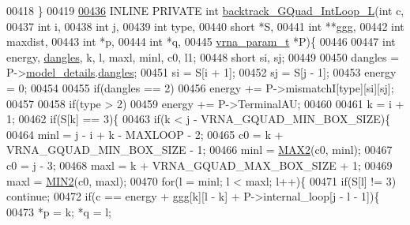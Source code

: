 \begin{DoxyCode}
00418 \}
00419 
\hypertarget{gquad_8h_source.tex_l00436}{}\hyperlink{group__gquads_ga7b371308fa5a45c7ac353ef6ed1014de}{00436} INLINE  PRIVATE \textcolor{keywordtype}{int} \hyperlink{group__gquads_ga7b371308fa5a45c7ac353ef6ed1014de}{backtrack\_GQuad\_IntLoop\_L}(\textcolor{keywordtype}{int} c,
00437                                               \textcolor{keywordtype}{int} i,
00438                                               \textcolor{keywordtype}{int} j,
00439                                               \textcolor{keywordtype}{int} type,
00440                                               \textcolor{keywordtype}{short} *S,
00441                                               \textcolor{keywordtype}{int} **ggg,
00442                                               \textcolor{keywordtype}{int} maxdist,
00443                                               \textcolor{keywordtype}{int} *p,
00444                                               \textcolor{keywordtype}{int} *q,
00445                                               \hyperlink{group__energy__parameters_structvrna__param__s}{vrna\_param\_t} *P)\{
00446 
00447   \textcolor{keywordtype}{int} energy, \hyperlink{group__model__details_ga72b511ed1201f7e23ec437e468790d74}{dangles}, k, l, maxl, minl, c0, l1;
00448   \textcolor{keywordtype}{short} si, sj;
00449 
00450   dangles = P->\hyperlink{group__energy__parameters_a7b84353eb9075c595bad4ceb871bcae7}{model\_details}.\hyperlink{structvrna__md__s_adcda4ff2ea77748ae0e8700288282efc}{dangles};
00451   si      = S[i + 1];
00452   sj      = S[j - 1];
00453   energy  = 0;
00454 
00455   \textcolor{keywordflow}{if}(dangles == 2)
00456     energy += P->mismatchI[type][si][sj];
00457 
00458   \textcolor{keywordflow}{if}(type > 2)
00459     energy += P->TerminalAU;
00460 
00461   k = i + 1;
00462   \textcolor{keywordflow}{if}(S[k] == 3)\{
00463     \textcolor{keywordflow}{if}(k < j - VRNA\_GQUAD\_MIN\_BOX\_SIZE)\{
00464       minl  = j - i + k - MAXLOOP - 2;
00465       c0    = k + VRNA\_GQUAD\_MIN\_BOX\_SIZE - 1;
00466       minl  = \hyperlink{group__utils_gadd91367918fadbc8d585940d6206d6d2}{MAX2}(c0, minl);
00467       c0    = j - 3;
00468       maxl  = k + VRNA\_GQUAD\_MAX\_BOX\_SIZE + 1;
00469       maxl  = \hyperlink{group__utils_ga2dd4a927a7f937f43a90c144d79107d8}{MIN2}(c0, maxl);
00470       \textcolor{keywordflow}{for}(l = minl; l < maxl; l++)\{
00471         \textcolor{keywordflow}{if}(S[l] != 3) \textcolor{keywordflow}{continue};
00472         \textcolor{keywordflow}{if}(c == energy + ggg[k][l - k] + P->internal\_loop[j - l - 1])\{
00473           *p = k; *q = l;

\end{DoxyCode}
